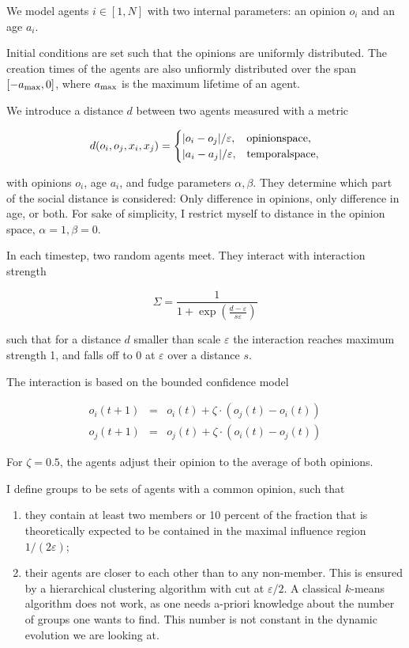 \documentclass[useAMS,usenatbib]{templates/mn2e}
\begin{document}
We model agents $i\in[1,N]$ with two internal parameters: an opinion
$o_i$ and an age $a_i$.

Initial conditions are set such that the opinions are uniformly
distributed. The creation times of the agents are also unfiormly
distributed over the span $[-a_{\rm max},0]$, where $a_{\rm max}$ is the maximum lifetime
of an agent.

We introduce a distance $d$ between two agents measured with a metric

\begin{equation}
    d(o_i,o_j,x_i, x_j) =
    \begin{cases}
        |o_i-o_j|/\varepsilon,&{\rm opinion space},\\
        |a_i-a_j|/\varepsilon,&{\rm temporal space},
    \end{cases}
\end{equation}

with opinions $o_i$, age $a_i$, and fudge
parameters $\alpha, \beta$. They determine which part of the social distance is
considered: Only difference in opinions, only difference in age, or
both. For sake of simplicity, I restrict myself to distance in the
opinion space, $\alpha=1, \beta=0$.

In each timestep, two random
agents meet. They interact with interaction strength

\begin{equation}
    \Sigma = \frac{1}{1+\exp\left(\frac{d-\varepsilon}{s\varepsilon}\right)}
\end{equation}

such that for a distance $d$ smaller than scale $\varepsilon$ the
interaction reaches maximum strength 1, and falls off to 0 at
$\varepsilon$ over a distance $s$.

The interaction is based on the bounded confidence model

\begin{eqnarray}
    o_i(t+1) &=& o_i(t)+\zeta\cdot(o_j(t)-o_i(t))\\
    o_j(t+1) &=& o_j(t)+\zeta\cdot(o_i(t)-o_j(t))
\end{eqnarray}

For $\zeta=0.5$, the agents adjust their opinion to the average of both
opinions.


I define groups to be sets of agents with a common opinion, such that

\begin{enumerate}
    \item they contain at least two members or 10 percent of the fraction
    that is theoretically expected to be contained in the maximal
    influence region $1/(2\varepsilon)$;
    \item their agents are closer to each other than to any
    non-member. This is ensured by a hierarchical clustering algorithm
    with cut at $\varepsilon/2$. A classical $k$-means algorithm does
    not work, as one needs a-priori knowledge about the number of groups
    one wants to find. This number is not constant in the dynamic
    evolution we are looking at.
\end{enumerate}
\end{document}
